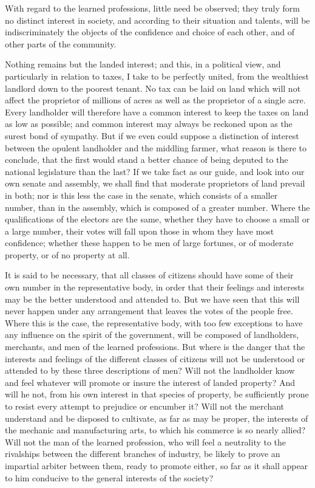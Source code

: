 With regard to the learned professions, little need be observed; they truly form no distinct interest in society, and according to their situation and talents, will be indiscriminately the objects of the confidence and choice of each other, and of other parts of the community.

Nothing remains but the landed interest; and this, in a political view, and particularly in relation to taxes, I take to be perfectly united, from the wealthiest landlord down to the poorest tenant. 
No tax can be laid on land which will not affect the proprietor of millions of acres as well as the proprietor of a single acre. 
Every landholder will therefore have a common interest to keep the taxes on land as low as possible; and common interest may always be reckoned upon as the surest bond of sympathy. 
But if we even could suppose a distinction of interest between the opulent landholder and the middling farmer, what reason is there to conclude, that the first would stand a better chance of being deputed to the national legislature than the last? 
If we take fact as our guide, and look into our own senate and assembly, we shall find that moderate proprietors of land prevail in both; nor is this less the case in the senate, which consists of a smaller number, than in the assembly, which is composed of a greater number. 
Where the qualifications of the electors are the same, whether they have to choose a small or a large number, their votes will fall upon those in whom they have most confidence; whether these happen to be men of large fortunes, or of moderate property, or of no property at all.

It is said to be necessary, that all classes of citizens should have some of their own number in the representative body, in order that their feelings and interests may be the better understood and attended to. 
But we have seen that this will never happen under any arrangement that leaves the votes of the people free. 
Where this is the case, the representative body, with too few exceptions to have any influence on the spirit of the government, will be composed of landholders, merchants, and men of the learned professions. 
But where is the danger that the interests and feelings of the different classes of citizens will not be understood or attended to by these three descriptions of men? 
Will not the landholder know and feel whatever will promote or insure the interest of landed property? 
And will he not, from his own interest in that species of property, be sufficiently prone to resist every attempt to prejudice or encumber it? 
Will not the merchant understand and be disposed to cultivate, as far as may be proper, the interests of the mechanic and manufacturing arts, to which his commerce is so nearly allied? 
Will not the man of the learned profession, who will feel a neutrality to the rivalships between the different branches of industry, be likely to prove an impartial arbiter between them, ready to promote either, so far as it shall appear to him conducive to the general interests of the society?

